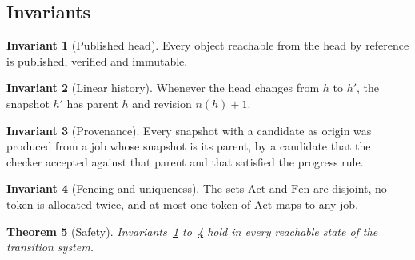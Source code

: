 \documentclass[11pt,a4paper]{article}
\theoremstyle{plain}
\newtheorem{theorem}{Theorem}[section]
\theoremstyle{definition}
\newtheorem{invariant}[theorem]{Invariant}
\theoremstyle{remark}
\theoremstyle{definition}
\begin{document}
\subsection{Invariants}

\begin{invariant}[Published head]
\label{inv:head}
Every object reachable from the head by reference is published, verified and immutable.
\end{invariant}

\begin{invariant}[Linear history]
\label{inv:linear}
Whenever the head changes from $h$ to $h'$, the snapshot $h'$ has parent $h$ and revision $n(h)+1$.
\end{invariant}

\begin{invariant}[Provenance]
\label{inv:prov}
Every snapshot with a candidate as origin was produced from a job whose snapshot is its parent, by a candidate that the checker accepted against that parent and that satisfied the progress rule.
\end{invariant}

\begin{invariant}[Fencing and uniqueness]
\label{inv:fence}
The sets $\mathrm{Act}$ and $\mathrm{Fen}$ are disjoint, no token is allocated twice, and at most one token of $\mathrm{Act}$ maps to any job.
\end{invariant}

\begin{theorem}[Safety]
\label{thm:safety}
Invariants~\ref{inv:head} to~\ref{inv:fence} hold in every reachable state of the transition system.
\end{theorem}
\end{document}
